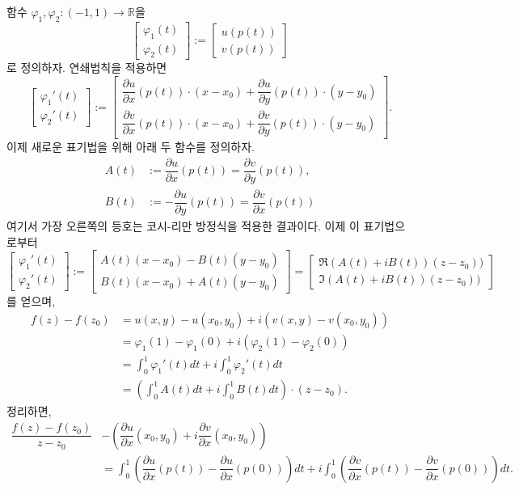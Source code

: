 함수 $\varphi_1, \varphi_2 : (-1,1) \to \mathbb R$을
\[
\begin{bmatrix}
\varphi_1(t) \\
\varphi_2(t)
\end{bmatrix}
:= 
\begin{bmatrix}
u(p(t)) \\
v(p(t))
\end{bmatrix}
\]
로 정의하자.
연쇄법칙을 적용하면
\[
\begin{bmatrix}
\varphi_1'(t) \\
\varphi_2'(t)
\end{bmatrix}
:= 
\begin{bmatrix}
\dfrac{\partial u}{\partial x}(p(t))\cdot (x-x_0) + \dfrac{\partial u}{\partial y}(p(t))\cdot (y-y_0) \\
\dfrac{\partial v}{\partial x}(p(t))\cdot (x-x_0) + \dfrac{\partial v}{\partial y}(p(t))\cdot (y-y_0) 
\end{bmatrix}.
\]
이제 새로운 표기법을 위해 아래 두 함수를 정의하자.  %
\begin{align*}
A(t) &:= \dfrac{\partial u}{\partial x}(p(t)) = \dfrac{\partial v}{\partial y}(p(t)), \\
B(t) &:= - \dfrac{\partial u}{\partial y}(p(t)) = \dfrac{\partial v}{\partial x}(p(t))
\end{align*}
여기서 가장 오른쪽의 등호는 코시-리만 방정식을 적용한 결과이다.
이제 이 표기법으로부터
\[
\begin{bmatrix}
\varphi_1'(t) \\
\varphi_2'(t)
\end{bmatrix}
:= 
\begin{bmatrix}
A(t) (x-x_0) - B(t) (y-y_0) \\
B(t) (x-x_0) + A(t) (y-y_0) 
\end{bmatrix}
= 
\begin{bmatrix}
\Re(A(t)+iB(t)) (z-z_0)) \\
\Im(A(t)+iB(t)) (z-z_0)) 
\end{bmatrix}
\]
를 얻으며,
\begin{align*}
f(z) - f(z_0) 
&= u(x,y) - u(x_0, y_0) + i (v(x,y) - v(x_0, y_0)) \\
&= \varphi_1(1) - \varphi_1(0) + i(\varphi_2(1) - \varphi_2(0)) \\
&= \int_0^1 \varphi_1'(t)dt + i\int_0^1 \varphi_2'(t)dt \\
&= \left( \int_0^1 A(t)dt + i \int_0^1 B(t)dt \right) \cdot (z-z_0).
\end{align*}
정리하면,
\begin{align*}
\dfrac{f(z)-f(z_0)}{z-z_0} 
&- \left( \dfrac{\partial u}{\partial x}(x_0,y_0) 
+ i \dfrac{\partial v}{\partial x}(x_0,y_0) \right) \\
&= \int_0^1 \left( \dfrac{\partial u}{\partial x}(p(t)) 
- \dfrac{\partial u}{\partial x}(p(0)) \right)dt 
+ i \int_0^1 \left( \dfrac{\partial v}{\partial x}(p(t)) 
- \dfrac{\partial v}{\partial x}(p(0)) \right)dt.
\end{align*}
